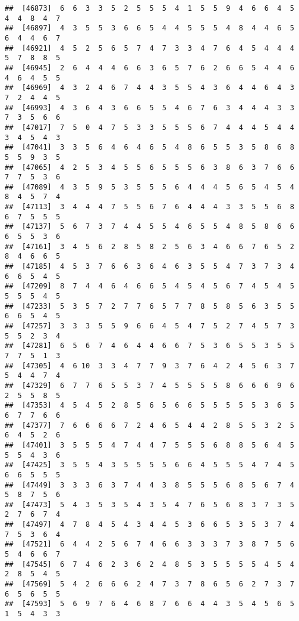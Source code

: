 \documentclass[
]{book}
\begin{document}
\begin{verbatim}
##  [46873]  6  6  3  3  5  2  5  5  5  4  1  5  5  9  4  6  6  4  5  4  4  8  4  7
##  [46897]  4  3  5  5  3  6  6  5  4  4  5  5  5  4  8  4  4  6  5  6  4  4  6  7
##  [46921]  4  5  2  5  6  5  7  4  7  3  3  4  7  6  4  5  4  4  4  5  7  8  8  5
##  [46945]  2  6  4  4  4  6  6  3  6  5  7  6  2  6  6  5  4  4  6  4  6  4  5  5
##  [46969]  4  3  2  4  6  7  4  4  3  5  5  4  3  6  4  4  6  4  3  7  2  4  4  5
##  [46993]  4  3  6  4  3  6  6  5  5  4  6  7  6  3  4  4  4  3  3  7  3  5  6  6
##  [47017]  7  5  0  4  7  5  3  3  5  5  5  6  7  4  4  4  5  4  4  3  4  5  4  3
##  [47041]  3  3  5  6  4  6  4  6  5  4  8  6  5  5  3  5  8  6  8  5  5  9  3  5
##  [47065]  4  2  5  3  4  5  5  6  5  5  5  6  3  8  6  3  7  6  6  7  7  5  3  6
##  [47089]  4  3  5  9  5  3  5  5  5  6  4  4  4  5  6  5  4  5  4  8  4  5  7  4
##  [47113]  3  4  4  4  7  5  5  6  7  6  4  4  4  3  3  5  5  6  8  6  7  5  5  5
##  [47137]  5  6  7  3  7  4  4  5  5  4  6  5  5  4  8  5  8  6  6  6  5  5  3  6
##  [47161]  3  4  5  6  2  8  5  8  2  5  6  3  4  6  6  7  6  5  2  8  4  6  6  5
##  [47185]  4  5  3  7  6  6  3  6  4  6  3  5  5  4  7  3  7  3  4  6  6  5  4  5
##  [47209]  8  7  4  4  6  4  6  6  5  4  5  4  5  6  7  4  5  4  5  5  5  5  4  5
##  [47233]  5  3  5  7  2  7  7  6  5  7  7  8  5  8  5  6  3  5  5  6  6  5  4  5
##  [47257]  3  3  3  5  5  9  6  6  4  5  4  7  5  2  7  4  5  7  3  5  5  2  3  4
##  [47281]  6  5  6  7  4  6  4  4  6  6  7  5  3  6  5  5  3  5  5  7  7  5  1  3
##  [47305]  4  6 10  3  3  4  7  7  9  3  7  6  4  2  4  5  6  3  7  5  4  4  7  4
##  [47329]  6  7  7  6  5  5  3  7  4  5  5  5  5  8  6  6  6  9  6  2  5  5  8  5
##  [47353]  4  5  4  5  2  8  5  6  5  6  6  5  5  5  5  5  3  6  5  6  7  7  6  6
##  [47377]  7  6  6  6  6  7  2  4  6  5  4  4  2  8  5  5  3  2  5  6  4  5  2  6
##  [47401]  3  5  5  5  4  7  4  4  7  5  5  5  6  8  8  5  6  4  5  5  5  4  3  6
##  [47425]  3  5  5  4  3  5  5  5  5  6  6  4  5  5  5  4  7  4  5  6  6  5  5  5
##  [47449]  3  3  3  6  3  7  4  4  3  8  5  5  5  6  8  5  6  7  4  5  8  7  5  6
##  [47473]  5  4  3  5  3  5  4  3  5  4  7  6  5  6  8  3  7  3  5  2  7  6  7  4
##  [47497]  4  7  8  4  5  4  3  4  4  5  3  6  6  5  3  5  3  7  4  7  5  3  6  4
##  [47521]  6  4  4  2  5  6  7  4  6  6  3  3  3  7  3  8  7  5  6  5  4  6  6  7
##  [47545]  6  7  4  6  2  3  6  2  4  8  5  3  5  5  5  5  4  5  4  2  8  5  4  5
##  [47569]  5  4  2  6  6  6  2  4  7  3  7  8  6  5  6  2  7  3  7  6  5  6  5  5
##  [47593]  5  6  9  7  6  4  6  8  7  6  6  4  4  3  5  4  5  6  5  1  5  4  3  3

\end{verbatim}
\end{document}
